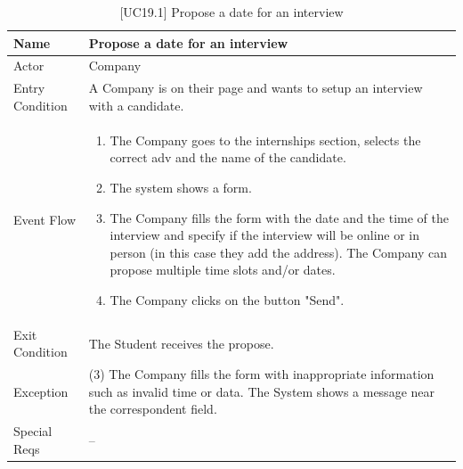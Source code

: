 \begin{table}[H] %
    \centering
    \begin{tabular}{|p{3cm}|p{10cm}|}
    \hline
    Name & Propose a date for an interview \\ \hline
    Actor  & Company \\ \hline
    Entry Condition  & A Company is on their page and wants to setup an interview with a candidate. \\ \hline
    Event Flow  & 
    \begin{enumerate}[noitemsep, topsep=0pt]
        \item The Company goes to the internships section, selects the correct adv and the name of the candidate.
        \item The system shows a form.
        \item The Company fills the form with the date and the time of the interview and specify if the interview will be online or in person (in this case they add the address). The Company can propose multiple time slots and/or dates.
        \item The Company clicks on the button "Send".
    \end{enumerate}
    \\ \hline
    Exit Condition  & The Student receives the propose. \\ \hline
    Exception  & (3) The Company fills the form with inappropriate information such as invalid time or data. The System shows a message near the correspondent field. \\ \hline
    Special Reqs  & -- \\ \hline
    \end{tabular}
    \caption{[UC19.1] Propose a date for an interview}
\end{table}

